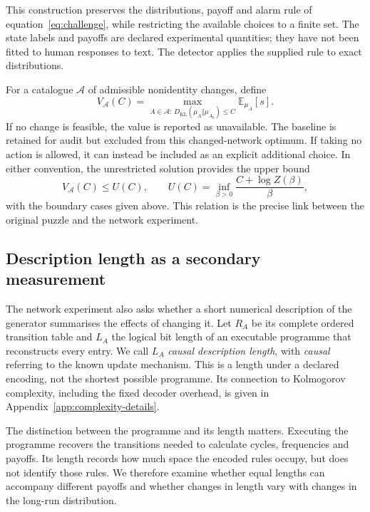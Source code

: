 \documentclass[11pt,a4paper]{article}
\newcommand{\KL}{D_{\mathrm{KL}}}
\newcommand{\E}{\mathbb{E}}
\begin{document}
This construction preserves the distributions, payoff and alarm rule
of equation~\eqref{eq:challenge}, while restricting the available choices
to a finite set. The state labels and payoffs are declared experimental
quantities; they have not been fitted to human responses to text.
The detector applies the supplied rule to exact distributions.

For a catalogue $\mathcal{A}$ of admissible nonidentity changes, define
\begin{equation}\label{eq:frontier}
 V_{\mathcal{A}}(C)=\max_{A\in\mathcal{A}:\,
       \KL(\mu_A\Vert\mu_{A_0})\leq C}\E_{\mu_A}[s].
\end{equation}
If no change is feasible, the value is reported as unavailable. The
baseline is retained for audit but excluded from this changed-network
optimum. If taking no action is allowed, it can instead be included as an
explicit additional choice. In either convention, the unrestricted solution
provides the upper bound
\begin{equation}\label{eq:upper}
 V_{\mathcal{A}}(C)\leq U(C),\qquad
 U(C)=\inf_{\beta>0}\frac{C+\log Z(\beta)}{\beta},
\end{equation}
with the boundary cases given above. This relation is the precise link
between the original puzzle and the network experiment.

\subsection{Description length as a secondary measurement}\label{sec:length-question}
The network experiment also asks whether a short numerical description of
the generator summarises the effects of changing it. Let $R_A$ be its
complete ordered transition table and $L_A$ the logical bit length of an
executable programme that reconstructs every entry. We call $L_A$
\emph{causal description length}, with \emph{causal} referring to the known
update mechanism. This is a length under a declared encoding, not the
shortest possible programme. Its connection to Kolmogorov complexity,
including the fixed decoder overhead, is given in
Appendix~\ref{app:complexity-details}.

The distinction between the programme and its length matters. Executing
the programme recovers the transitions needed to calculate cycles,
frequencies and payoffs. Its length records how much space the encoded
rules occupy, but does not identify those rules. We therefore examine
whether equal lengths can accompany different payoffs and whether changes
in length vary with changes in the long-run distribution.
\end{document}

